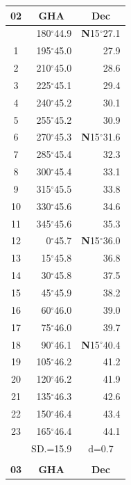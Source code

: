 \documentclass[10pt, a4paper]{report}
\begin{document}
\begin{scriptsize}
\noindent
\begin{tabular*}{0.2\textwidth}[t]{@{\extracolsep{\fill}}|c|rr|}
\hline
\multicolumn{1}{|c|}{\rule{0pt}{2.6ex}\textbf{02}} & \multicolumn{1}{c}{\textbf{GHA}} & \multicolumn{1}{c|}{\textbf{Dec}}\\
\hline\rule{0pt}{2.6ex}\noindent
0 & 180$^\circ$44.9 & \textbf{N}15$^\circ$27.1\\
1 & 195$^\circ$45.0 & 27.9\\
2 & 210$^\circ$45.0 & 28.6\\
3 & 225$^\circ$45.1 & \raisebox{0.24ex}{\boldmath$\cdot$~\boldmath$\cdot$~~}29.4\\
4 & 240$^\circ$45.2 & 30.1\\
5 & 255$^\circ$45.2 & 30.9\\[2Pt]
6 & 270$^\circ$45.3 & \textbf{N}15$^\circ$31.6\\
7 & 285$^\circ$45.4 & 32.3\\
8 & 300$^\circ$45.4 & 33.1\\
9 & 315$^\circ$45.5 & \raisebox{0.24ex}{\boldmath$\cdot$~\boldmath$\cdot$~~}33.8\\
10 & 330$^\circ$45.6 & 34.6\\
11 & 345$^\circ$45.6 & 35.3\\[2Pt]
12 & 0$^\circ$45.7 & \textbf{N}15$^\circ$36.0\\
13 & 15$^\circ$45.8 & 36.8\\
14 & 30$^\circ$45.8 & 37.5\\
15 & 45$^\circ$45.9 & \raisebox{0.24ex}{\boldmath$\cdot$~\boldmath$\cdot$~~}38.2\\
16 & 60$^\circ$46.0 & 39.0\\
17 & 75$^\circ$46.0 & 39.7\\[2Pt]
18 & 90$^\circ$46.1 & \textbf{N}15$^\circ$40.4\\
19 & 105$^\circ$46.2 & 41.2\\
20 & 120$^\circ$46.2 & 41.9\\
21 & 135$^\circ$46.3 & \raisebox{0.24ex}{\boldmath$\cdot$~\boldmath$\cdot$~~}42.6\\
22 & 150$^\circ$46.4 & 43.4\\
23 & 165$^\circ$46.4 & 44.1\\
\hline
\rule{0pt}{2.4ex} & \multicolumn{1}{c}{SD.=15.9} & \multicolumn{1}{c|}{d=0.7}\\
\hline
\multicolumn{1}{c}{}\\[-0.5ex]\hline
\multicolumn{1}{|c|}{\rule{0pt}{2.6ex}\textbf{03}} & \multicolumn{1}{c}{\textbf{GHA}} & \multicolumn{1}{c|}{\textbf{Dec}}\\

\end{tabular*}
\end{scriptsize}
\end{document}
